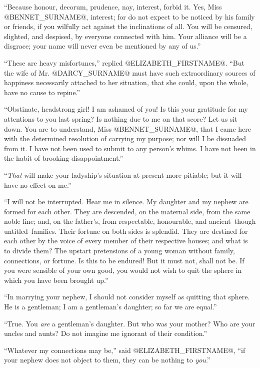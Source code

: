 ``Because honour, decorum, prudence, nay, interest, forbid it. Yes,
Miss @BENNET_SURNAME@, interest; for do not expect to be noticed by his family or
friends, if you wilfully act against the inclinations of all. You will
be censured, slighted, and despised, by everyone connected with him.
Your alliance will be a disgrace; your name will never even be mentioned
by any of us.''

``These are heavy misfortunes,'' replied @ELIZABETH_FIRSTNAME@. ``But the wife of Mr.
@DARCY_SURNAME@ must have such extraordinary sources of happiness necessarily
attached to her situation, that she could, upon the whole, have no cause
to repine.''

``Obstinate, headstrong girl! I am ashamed of you! Is this your gratitude
for my attentions to you last spring? Is nothing due to me on that
score? Let us sit down. You are to understand, Miss @BENNET_SURNAME@, that I came
here with the determined resolution of carrying my purpose; nor will
I be dissuaded from it. I have not been used to submit to any person's
whims. I have not been in the habit of brooking disappointment.''

``\textit{That} will make your ladyship's situation at present more pitiable;
but it will have no effect on me.''

``I will not be interrupted. Hear me in silence. My daughter and my
nephew are formed for each other. They are descended, on the maternal
side, from the same noble line; and, on the father's, from respectable,
honourable, and ancient--though untitled--families. Their fortune on
both sides is splendid. They are destined for each other by the voice of
every member of their respective houses; and what is to divide them?
The upstart pretensions of a young woman without family, connections,
or fortune. Is this to be endured! But it must not, shall not be. If you
were sensible of your own good, you would not wish to quit the sphere in
which you have been brought up.''

``In marrying your nephew, I should not consider myself as quitting that
sphere. He is a gentleman; I am a gentleman's daughter; so far we are
equal.''

``True. You \textit{are} a gentleman's daughter. But who was your mother?
Who are your uncles and aunts? Do not imagine me ignorant of their
condition.''

``Whatever my connections may be,'' said @ELIZABETH_FIRSTNAME@, ``if your nephew does
not object to them, they can be nothing to \textit{you}.''

